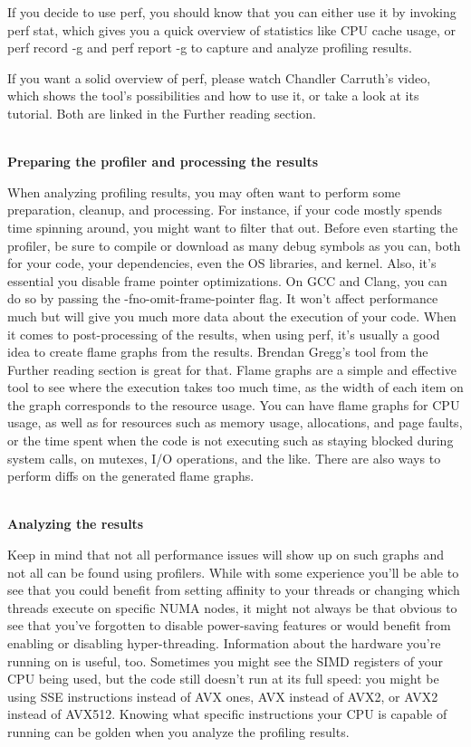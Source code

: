If you decide to use perf, you should know that you can either use it by invoking perf stat, which gives you a quick overview of statistics like CPU cache usage, or perf record -g and perf report -g to capture and analyze profiling results.

If you want a solid overview of perf, please watch Chandler Carruth's video, which shows the tool's possibilities and how to use it, or take a look at its tutorial. Both are linked in the Further reading section.

\hspace*{\fill} \\ %
\noindent
\textbf{Preparing the profiler and processing the results}

When analyzing profiling results, you may often want to perform some preparation, cleanup, and processing. For instance, if your code mostly spends time spinning around, you might want to filter that out. Before even starting the profiler, be sure to compile or download as many debug symbols as you can, both for your code, your dependencies, even the OS libraries, and kernel. Also, it's essential you disable frame pointer optimizations. On GCC and Clang, you can do so by passing the -fno-omit-frame-pointer flag. It won't affect performance much but will give you much more data about the execution of your code. When it comes to post-processing of the results, when using perf, it's usually a good idea to create flame graphs from the results. Brendan Gregg's tool from the Further reading section is great for that. Flame graphs are a simple and effective tool to see where the execution takes too much time, as the width of each item on the graph corresponds to the resource usage. You can have flame graphs for CPU usage, as well as for resources such as memory usage, allocations, and page faults, or the time spent when the code is not executing such as staying blocked during system calls, on mutexes, I/O operations, and the like. There are also ways to perform diffs on the generated flame graphs.

\hspace*{\fill} \\ %
\noindent
\textbf{Analyzing the results}

Keep in mind that not all performance issues will show up on such graphs and not all can be found using profilers. While with some experience you'll be able to see that you could benefit from setting affinity to your threads or changing which threads execute on specific NUMA nodes, it might not always be that obvious to see that you've forgotten to disable power-saving features or would benefit from enabling or disabling hyper-threading. Information about the hardware you're running on is useful, too. Sometimes you might see the SIMD registers of your CPU being used, but the code still doesn't run at its full speed: you might be using SSE instructions instead of AVX ones, AVX instead of AVX2, or AVX2 instead of AVX512. Knowing what specific instructions your CPU is capable of running can be golden when you analyze the profiling results.

